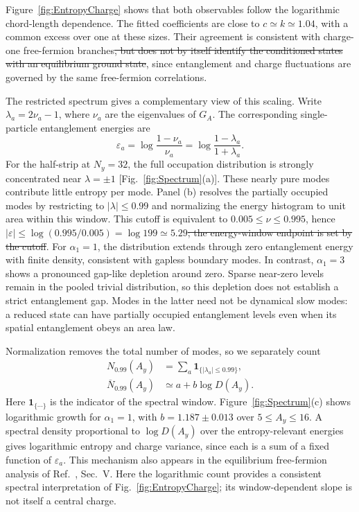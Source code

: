 \documentclass[aps,prb,10pt,twocolumn,superscriptaddress,longbibliography,floatfix]{revtex4-2}
\newcommand{\claudeadd}[1]{{\color{orange}#1}}
\newcommand{\claudedel}[1]{{\color{orange}\sout{#1}}}
\begin{document}
{\color{blue}
Figure~\ref{fig:EntropyCharge} shows that both observables follow the logarithmic chord-length dependence. The fitted coefficients are close to $c\simeq k\simeq1.04$, with a common excess over one at these sizes. Their agreement is consistent with charge-one free-fermion branches\claudedel{, but does not by itself identify the conditioned states with an equilibrium ground state}\claudeadd{, since entanglement and charge fluctuations are governed by the same free-fermion correlations}.

The restricted spectrum gives a complementary view of this scaling. \claudeadd{Write $\lambda_a=2\nu_a-1$, where $\nu_a$ are the eigenvalues of $G_A$.} The corresponding single-particle entanglement energies are
\begin{equation}
 \varepsilon_a=\log\frac{1-\nu_a}{\nu_a}
 =\log\frac{1-\lambda_a}{1+\lambda_a}.
 \label{eq:EntanglementEnergies}
\end{equation}
For the half-strip at $N_y=32$, the full occupation distribution is strongly concentrated near $\lambda=\pm1$ [Fig.~\ref{fig:Spectrum}(a)]. These nearly pure modes contribute little entropy per mode. Panel (b) resolves the partially occupied modes by restricting to $|\lambda|\leq0.99$ and normalizing the energy histogram to unit area within this window. This cutoff is equivalent to $0.005\leq\nu\leq0.995$, hence $|\varepsilon|\leq\log(0.995/0.005)=\log199\simeq5.29$\claudedel{; the energy-window endpoint is set by the cutoff}. For $\alpha_1=1$, the distribution extends through zero entanglement energy with finite density, consistent with gapless boundary modes. In contrast, $\alpha_1=3$ shows a pronounced gap-like depletion around zero. Sparse near-zero levels remain in the pooled trivial distribution, so this depletion does not establish a strict entanglement gap. Modes in the latter need not be dynamical slow modes: a reduced state can have partially occupied entanglement levels even when its spatial entanglement obeys an area law.

Normalization removes the total number of modes, so we separately count
\begin{align}
 N_{0.99}(A_y)&=\sum_a\mathbf1_{\{|\lambda_a|\leq0.99\}},\nonumber\\
 \overline N_{0.99}(A_y)&\simeq a+b\log D(A_y).
 \label{eq:WindowCount}
\end{align}
Here $\mathbf1_{\{\cdots\}}$ is the indicator of the spectral window. Figure~\ref{fig:Spectrum}(c) shows logarithmic growth for $\alpha_1=1$, with $b=1.187\pm0.013$ over $5\leq A_y\leq16$. A spectral density proportional to $\log D(A_y)$ over the entropy-relevant energies gives logarithmic entropy and charge variance, since each is a sum of a fixed function of $\varepsilon_a$. This mechanism also appears in the equilibrium free-fermion analysis of Ref.~\cite{EislerPeschel2010}, Sec.~V. Here the logarithmic count provides a consistent spectral interpretation of Fig.~\ref{fig:EntropyCharge}; its window-dependent slope is not itself a central charge.
}
\end{document}
